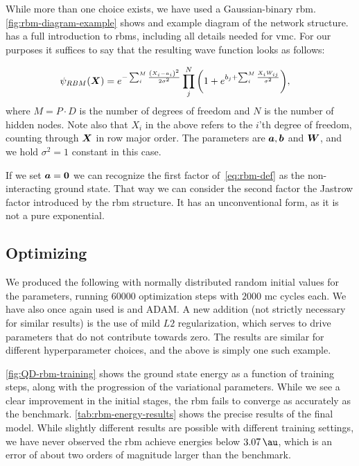 \documentclass[Thesis.tex]{subfiles}
\begin{document}
While more than one choice exists, we have used a Gaussian-binary \gls{rbm}\@.
\cref{fig:rbm-diagram-example} shows and example diagram of the network
structure. \textcite{Flugsrud-2018} has a full introduction to \glspl{rbm}, including
all details needed for \gls{vmc}\@. For our purposes it suffices to say that the
resulting wave function looks as follows:

\begin{align}
  \label{eq:rbm-def}
  \psi_{RBM}(\bm{X}) &=
        e^{-\sum_i^{M} \frac{\qty(X_i-a_i)^2}{2\sigma^2}}
        \prod_j^N \qty(1 + e^{b_j+\sum_i^M \frac{X_iW_{ij}}{\sigma^2}}),
\end{align}
where $M = P\cdot D$ is the number of degrees of freedom and $N$ is the number
of hidden nodes. Note also that $X_i$ in the above refers to the $i$'th degree
of freedom, counting through $\bm{X}$ in row major order. The parameters are
$\bm{a}, \bm{b}$ and $\bm{W}$, and we hold $\sigma^2=1$ constant in this case.

If we set $\bm{a} = \bm{0}$ we can recognize the first factor of~\cref{eq:rbm-def}
as the non-interacting ground state. That way we can consider the second factor
the Jastrow factor introduced by the \gls{rbm} structure. It has an unconventional
form, as it is not a pure exponential.


\subsection{Optimizing}

We produced the following with normally distributed random
initial values for the parameters, running $\num{60000}$ optimization steps with
$\num{2000}$ \gls{mc} cycles each. We have also once again used \acrlong{is}
and ADAM\@. A new addition (not strictly necessary for similar results) is the use
of mild $L2$ regularization, which serves to drive parameters that do not
contribute towards zero. The results are similar for different hyperparameter
choices, and the above is simply one such example.

\cref{fig:QD-rbm-training} shows the ground state energy as a function of
training steps, along with the progression of the variational
parameters. While we see a clear improvement in the initial stages, the \gls{rbm}
fails to converge as accurately as the benchmark. \cref{tab:rbm-energy-results}
shows the precise results of the final model. While slightly different results
are possible with different training settings, we have never observed the \gls{rbm}
achieve energies below $\SI{3.07}{\au}$, which is an error of about two orders
of magnitude larger than the benchmark.
\end{document}
